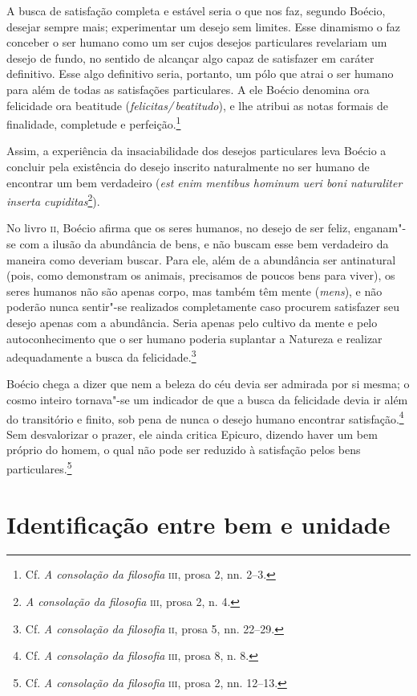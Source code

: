 A busca de satisfação completa e estável seria o que nos faz,
segundo Boécio, desejar sempre mais; experimentar um desejo sem
limites. Esse dinamismo o faz conceber o ser humano como um ser
cujos desejos particulares revelariam um desejo de fundo, no
sentido de alcançar algo capaz de satisfazer em caráter
definitivo. Esse algo definitivo seria, portanto, um pólo que
atrai o ser humano para além de todas as satisfações
particulares. A ele Boécio denomina ora felicidade ora beatitude
(\emph{felicitas/\,beatitudo}), e lhe atribui as notas formais
de finalidade, completude e perfeição.\footnote{ Cf. \emph{A
consolação da filosofia} \textsc{iii}, prosa 2, nn. 2--3.}

Assim, a experiência da insaciabilidade dos desejos particulares
leva Boécio a concluir pela existência do desejo inscrito
naturalmente no ser humano de encontrar um bem verdadeiro
(\emph{est enim mentibus hominum ueri boni naturaliter inserta
cupiditas}\footnote{ \emph{A consolação da filosofia} \textsc{iii},
prosa 2, n. 4.}).

No livro \textsc{ii}, Boécio afirma que os seres humanos, no desejo de ser
feliz, enganam"-se com a ilusão da abundância de bens, e não
buscam esse bem verdadeiro da maneira como deveriam buscar. Para
ele, além de a abundância ser antinatural (pois, como demonstram
os animais, precisamos de poucos bens para viver), os seres
humanos não são apenas corpo, mas também têm mente
(\emph{mens}), e não poderão nunca sentir"-se realizados
completamente caso procurem satisfazer seu desejo apenas com a
abundância. Seria apenas pelo cultivo da mente e pelo
autoconhecimento que o ser humano poderia suplantar a Natureza e
realizar adequadamente a busca da felicidade.\footnote{ Cf.
\emph{A consolação da filosofia} \textsc{ii}, prosa 5, nn. 22--29.}

Boécio chega a dizer que nem a beleza do céu devia ser admirada
por si mesma; o cosmo inteiro tornava"-se um indicador de que a
busca da felicidade devia ir além do transitório e finito, sob
pena de nunca o desejo humano encontrar satisfação.\footnote{ Cf.
\emph{A consolação da filosofia} \textsc{iii}, prosa 8, n. 8.} Sem
desvalorizar o prazer, ele ainda critica Epicuro, dizendo haver
um bem próprio do homem, o qual não pode ser reduzido à
satisfação pelos bens particulares.\footnote{ Cf. \emph{A
consolação da filosofia} \textsc{iii}, prosa 2, nn. 12--13.}

\section{Identificação entre bem e unidade}

